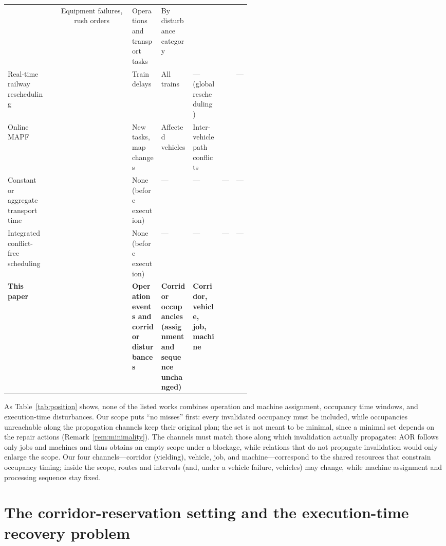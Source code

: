 \documentclass[manuscript,screen,review]{acmart}
\newcommand{\cmark}{\ding{51}}
\newcommand{\xmark}{\ding{55}}
\begin{document}
\begin{table}[t]
\begin{tabular}{@{}>{\raggedright\arraybackslash}p{0.18\linewidth}cc>{\raggedright\arraybackslash}p{0.12\linewidth}>{\raggedright\arraybackslash}p{0.13\linewidth}>{\raggedright\arraybackslash}p{0.12\linewidth}cc@{}}
\cmark & \xmark & Equipment failures, rush orders & Operations and transport tasks & By disturbance category & \xmark & \cmark \\
Real-time railway rescheduling~\cite{mascis2002alternative,dariano2007branch} &
\xmark & \cmark & Train delays & All trains & --- (global rescheduling) & \cmark & --- \\
Online MAPF~\cite{svancara2019online,malka2024online} &
\xmark & \cmark & New tasks, map changes & Affected vehicles & Inter-vehicle path conflicts & \cmark & \xmark \\
Constant or aggregate transport time~\cite{meng2025cp,qin2026knowledge,jafarian2026integrated} &
\cmark & \xmark & None (before execution) & --- & --- & --- & --- \\
Integrated conflict-free scheduling~\cite{vanos2026exact,sun2023integrated,li2026framework} &
\cmark & \cmark & None (before execution) & --- & --- & --- & --- \\
\midrule
\textbf{This paper} &
\cmark & \cmark & \textbf{Operation events and corridor disturbances} & \textbf{Corridor occupancies (assignment and sequence unchanged)} & \textbf{Corridor, vehicle, job, machine} & \cmark & \cmark \\
\bottomrule
\end{tabular}
\end{table}

As Table~\ref{tab:position} shows, none of the listed works combines operation and machine assignment, occupancy time windows, and execution-time disturbances.
Our scope puts ``no misses'' first: every invalidated occupancy must be included, while occupancies unreachable along the propagation channels keep their original plan;
the set is not meant to be minimal, since a minimal set depends on the repair actions (Remark~\ref{rem:minimality}).
The channels must match those along which invalidation actually propagates: AOR follows only jobs and machines and thus obtains an empty scope under a blockage,
while relations that do not propagate invalidation would only enlarge the scope.
Our four channels---corridor (yielding), vehicle, job, and machine---correspond to the shared resources that constrain occupancy timing;
inside the scope, routes and intervals (and, under a vehicle failure, vehicles) may change, while machine assignment and processing sequence stay fixed.

\section{The corridor-reservation setting and the execution-time recovery problem}
\label{sec:problem}
\end{document}
